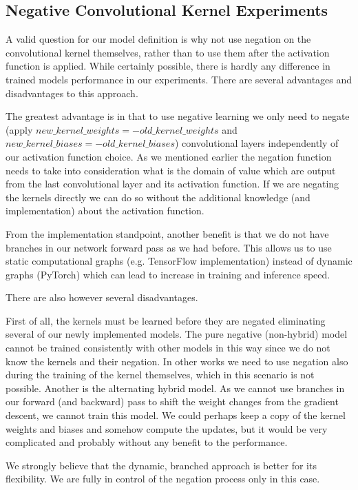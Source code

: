 \documentclass[b5paper]{book}
\begin{document}
\subsection{Negative Convolutional Kernel Experiments}

A valid question for our model definition is why not use negation on the convolutional kernel themselves, rather than to use them after the activation function is applied. While certainly possible, there is hardly any difference in trained models performance in our experiments. There are several advantages and disadvantages to this approach.

The greatest advantage is in that to use negative learning we only need to negate (apply \( new\_kernel\_weights = - old\_kernel\_weights \) and \( new\_kernel\_biases = -  old\_kernel\_biases \)) convolutional layers independently of our activation function choice. As we mentioned earlier the negation function needs to take into consideration what is the domain of value which are output from the last convolutional layer and its activation function. If we are negating the kernels directly we can do so without the additional knowledge (and implementation) about the activation function. 

From the implementation standpoint, another benefit is that we do not have branches in our network forward pass as we had before. This allows us to use static computational graphs (e.g. TensorFlow implementation) instead of dynamic graphs (PyTorch) which can lead to increase in training and inference speed.

There are also however several disadvantages. 

First of all, the kernels must be learned before they are negated eliminating several of our newly implemented models. The pure negative (non-hybrid) model cannot be trained consistently with other models in this way since we do not know the kernels and their negation. In other works we need to use negation also during the training of the kernel themselves, which in this scenario is not possible. Another is the alternating hybrid model. As we cannot use branches in our forward (and backward) pass to shift the weight changes from the gradient descent, we cannot train this model. We could perhaps keep a copy of the kernel weights and biases and somehow compute the updates, but it would be very complicated and probably without any benefit to the performance.

We strongly believe that the dynamic, branched approach is better for its flexibility. We are fully in control of the negation process only in this case.
\end{document}
